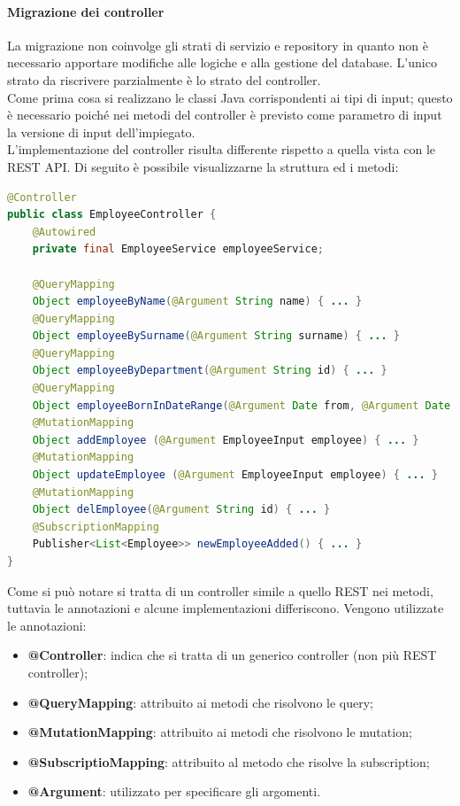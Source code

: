 \paragraph{Migrazione dei controller}
La migrazione non coinvolge gli strati di servizio e repository in quanto non è necessario apportare modifiche alle logiche e alla gestione del database. L'unico strato da riscrivere parzialmente è lo strato del controller.\\
Come prima cosa si realizzano le classi Java corrispondenti ai tipi di input; questo è necessario poiché nei metodi del controller è previsto come parametro di input la versione di input dell'impiegato.\\
L'implementazione del controller risulta differente rispetto a quella vista con le REST API. Di seguito è possibile visualizzarne la struttura ed i metodi:
\begin{lstlisting}[language=Java, title={EmployeeController.java}, morecomment={[s][\color{DarkOrchid}]{@}{\ }},  morecomment={[s][\color{OliveGreen}]{"}{"}},]
@Controller
public class EmployeeController {
    @Autowired
    private final EmployeeService employeeService;

    @QueryMapping
    Object employeeByName(@Argument String name) { ... }
    @QueryMapping
    Object employeeBySurname(@Argument String surname) { ... }
    @QueryMapping
    Object employeeByDepartment(@Argument String id) { ... }
    @QueryMapping
    Object employeeBornInDateRange(@Argument Date from, @Argument Date to) { ... }
    @MutationMapping
    Object addEmployee (@Argument EmployeeInput employee) { ... }
    @MutationMapping
    Object updateEmployee (@Argument EmployeeInput employee) { ... }
    @MutationMapping
    Object delEmployee(@Argument String id) { ... }
    @SubscriptionMapping
    Publisher<List<Employee>> newEmployeeAdded() { ... }
}
\end{lstlisting}
Come si può notare si tratta di un controller simile a quello REST nei metodi, tuttavia le annotazioni e alcune implementazioni differiscono. Vengono utilizzate le annotazioni:
\begin{itemize}
  \item \textbf{@Controller}: indica che si tratta di un generico controller (non più REST controller);
  \item \textbf{@QueryMapping}: attribuito ai metodi che risolvono le query;
  \item \textbf{@MutationMapping}: attribuito ai metodi che risolvono le mutation;
  \item \textbf{@SubscriptioMapping}: attribuito al metodo che risolve la subscription;
  \item \textbf{@Argument}: utilizzato per specificare gli argomenti.
\end{itemize}
